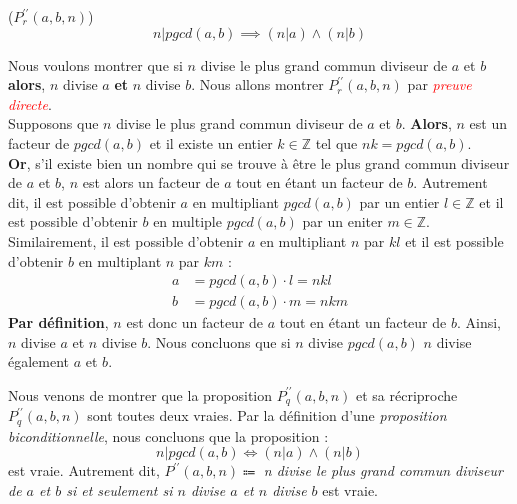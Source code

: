 \documentclass[16pt]{report}
\begin{document}
\begin{multicols*}{2}
    \begin{prop}{($P^{\prime\prime}_r(a,b, n)$)}{}
        \[ n|pgcd(a,b) \implies (n|a) \land (n|b) \]
    \end{prop}

    \begin{Preuve*}{}{}
       Nous voulons montrer que si $n$ divise le plus grand commun diviseur de $a$ et $b$ \textbf{alors}, $n$ 
       divise $a$ \textbf{et} $n$ divise $b$. Nous allons montrer 
       $P^{\prime\prime}_r(a,b, n)$ par \textcolor{red}{\textit{preuve directe}}. \vspace{1em} \\
        Supposons que $n$ divise le plus grand commun diviseur de $a$ et $b$. \textbf{Alors}, $n$ 
        est un facteur de $pgcd(a,b)$ et il existe un entier $k \in \mathbb{Z}$ tel que 
        $nk = pgcd(a,b)$.  \vspace{1em} \\ 
        \textbf{Or}, s'il existe bien un nombre qui se trouve à être le plus grand commun diviseur de $a$ 
        et $b$, $n$ est alors un facteur de $a$ tout en étant un facteur de $b$. Autrement dit, 
        il est possible d'obtenir $a$ en multipliant $pgcd(a,b)$ par un entier $l \in \mathbb{Z}$  
        et il est possible d'obtenir $b$ en multiple $pgcd(a,b)$ par un eniter $m \in \mathbb{Z}$. 
        \vspace{1em} \\ 
        Similairement, il est possible d'obtenir $a$ en multipliant $n$ par $kl$ et 
        il est possible d'obtenir $b$ en multiplant $n$ par $km$ : 
        \begin{align*}
                a &= pgcd(a, b) \cdot l = nkl \\
                b &= pgcd(a, b) \cdot m = nkm 
        \end{align*}
        \textbf{Par définition}, $n$ est donc un facteur de $a$ tout en étant un facteur de $b$. 
        Ainsi, $n$ divise $a$ et $n$ divise $b$. Nous concluons que si $n$ divise $pgcd(a,b)$ 
        $n$ divise également $a$ et $b$. 
    \end{Preuve*}

    Nous venons de montrer que la proposition $P^{\prime\prime}_q(a, b, n)$ et sa 
    récriproche $P^{\prime\prime}_q(a, b, n)$ sont toutes deux vraies. Par la définition d'une 
    \textit{proposition biconditionnelle}, nous concluons que la proposition :
    \[ n|pgcd(a,b) \Leftrightarrow (n|a) \land (n|b) \]
    est vraie. Autrement dit, $P^{\prime\prime}(a, b, n) \Coloneqq$ 
    \textit{n divise le plus grand commun diviseur de $a$ et $b$ si et seulement si $n$ divise $a$ 
    et $n$ divise $b$} est vraie. 


\end{multicols*}
\end{document}
